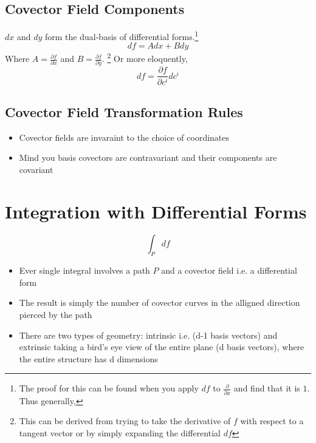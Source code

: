 \subsection{Covector Field Components}
$dx$ and $dy$ form the dual-basis of differential forms.\footnote{The proof for this can be found when you apply $df$ to $\frac{\partial}{\partial x}$ and find that it is $1$. Thus generally, }
$$df = A dx + B dy$$
Where $A = \frac{\partial f}{\partial x}$ and $B = \frac{\partial f}{\partial y}$. \footnote{This can be derived from trying to take the derivative of $f$ with respect to a tangent vector or by simply expanding the differential $df$}
Or more eloquently,
$$df = \frac{\partial f}{\partial c^{i}} dc^{i}$$
\subsection{Covector Field Transformation Rules}
\begin{itemize}
\item Covector fields are invaraint to the choice of coordinates
\item Mind you basis covectors are contravariant and their components are covariant
\end{itemize}
\section{Integration with Differential Forms}
$$\int_{P} df$$
\begin{itemize}
\item Ever single integral involves a path $P$ and a covector field i.e. a differential form
\item The result is simply the number of covector curves in the alligned direction pierced by the path
\item There are two types of geometry: intrinsic i.e. (d-1 basis vectors) and extrinsic taking a bird's eye view of the entire plane (d basis vectors), where the entire structure has d dimensions
\end{itemize}
